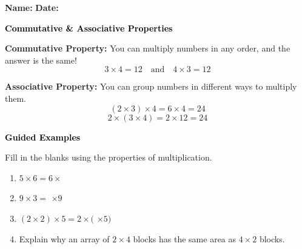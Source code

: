 \documentclass[12pt, letterpaper, fleqn]{article}
\newcommand{\blank}{\underline{\hspace{2.2cm}}}
\begin{document}
\textbf{Name:} \underline{\hspace{5cm}}
\hfill
\textbf{Date:} \underline{\hspace{3cm}}\\

\begin{tcolorbox}[colback=customteal!20]
    \large\textcolor{black}{\textbf{Commutative & Associative Properties}}
\end{tcolorbox}

\vspace{3mm}
\noindent
\textbf{Commutative Property:} You can multiply numbers in any order, and the answer is the same!
\[
3 \times 4 = 12 \quad \text{and} \quad 4 \times 3 = 12
\]

\textbf{Associative Property:} You can group numbers in different ways to multiply them.
\[
(2 \times 3) \times 4 = 6 \times 4 = 24
\]
\[
2 \times (3 \times 4) = 2 \times 12 = 24
\]

\newpage
\begin{tcolorbox}[colback=customteal!20]
    \large\textcolor{black}{\textbf{Guided Examples}}
\end{tcolorbox}

\vspace{5mm}
\noindent
Fill in the blanks using the properties of multiplication.

\vspace{8mm}
\begin{enumerate}[itemsep=2cm, leftmargin=0.6cm]
\item $5 \times 6 = 6 \times$ \blank
\item $9 \times 3 = $ \blank $\times 9$
\item $(2 \times 2) \times 5 = 2 \times ($ \blank $\times 5)$
\item Explain why an array of $2 \times 4$ blocks has the same area as $4 \times 2$ blocks.
\vspace{2cm}
\end{enumerate}
\end{document}
